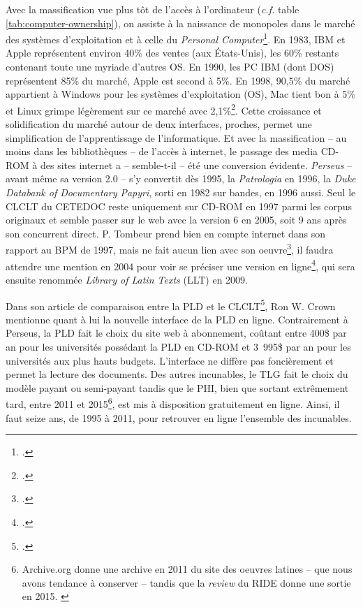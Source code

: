 Avec la massification vue plus tôt de l'accès à l'ordinateur (\textit{c.f.} table \ref{tab:computer-ownership}), on assiste à la naissance de monopoles dans le marché des systèmes d'exploitation et à celle du \textit{Personal Computer}\footcite{schlender_whos_1990}. En 1983, IBM et Apple représentent environ 40\% des ventes (aux États-Unis), les 60\% restants contenant toute une myriade d'autres OS. En 1990, les PC IBM (dont DOS) représentent 85\% du marché, Apple est second à 5\%. En 1998, 90,5\% du marché appartient à Windows pour les systèmes d'exploitation (OS), Mac tient bon à 5\% et Linux grimpe légèrement sur ce marché avec 2,1\%\footcite{miles_windows_1999, reimer_total_2005}. Cette croissance et solidification du marché autour de deux interfaces, proches, permet une simplification de l'apprentissage de l'informatique. Et avec la massification -- au moins dans les bibliothèques -- de l'accès à internet, le passage des media CD-ROM à des sites internet a -- semble-t-il -- été une conversion évidente. \textit{Perseus} -- avant même sa version 2.0 -- s'y convertit dès 1995, la \textit{Patrologia} en 1996, la \textit{Duke Databank of Documentary Papyri}, sorti en 1982 sur bandes, en 1996 aussi. Seul le CLCLT du CETEDOC reste uniquement sur CD-ROM en 1997 parmi les corpus originaux et semble passer sur le web avec la version 6 en 2005, soit 9 ans après son concurrent direct. P. Tombeur prend bien en compte internet dans son rapport au BPM de 1997, mais ne fait aucun lien avec son oeuvre\footcite{tombeur_informatique_1997}, il faudra attendre une mention en 2004 pour voir se préciser une version en ligne\footcite{tombeur_augustin_2004}, qui sera ensuite renommée \textit{Library of Latin Texts} (LLT) en 2009.

Dans son article de comparaison entre la PLD et le CLCLT\footcite{crown_comparing_2000}, Ron W. Crown mentionne quant à lui la nouvelle interface de la PLD en ligne. Contrairement à Perseus, la PLD fait le choix du site web à abonnement, coûtant entre 400\$ par an pour les universités possédant la PLD en CD-ROM et 3~995\$ par an pour les universités aux plus hauts budgets. L'interface ne diffère pas foncièrement et permet la lecture des documents. Des autres incunables, le TLG fait le choix du modèle payant ou semi-payant tandis que le PHI, bien que sortant extrêmement tard, entre 2011 et 2015\footnote{Archive.org donne une archive en 2011 du site des oeuvres latines -- que nous avons tendance à conserver -- tandis que la \textit{review} du RIDE donne une sortie en 2015. \cite{noauthor_phi_nodate, daniel_kozak_classical_2018}}, est mis à disposition gratuitement en ligne. Ainsi, il faut seize ans, de 1995 à 2011, pour retrouver en ligne l'ensemble des incunables. 

